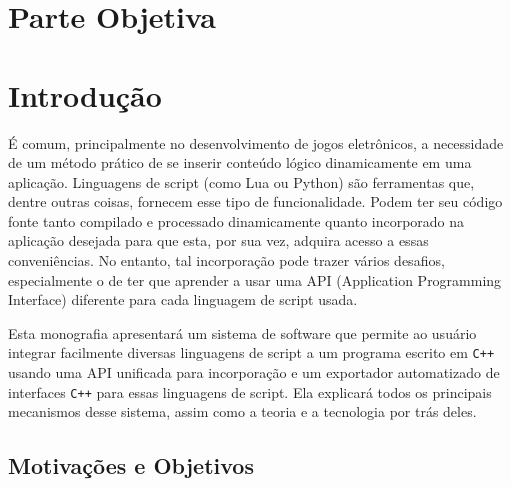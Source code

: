 \chapter*{Parte Objetiva}
\label{sec:parte_objetiva}
\chapter{Introdução}
\label{sec:intr}

É comum, principalmente no desenvolvimento de jogos eletrônicos, a necessidade
de um método prático de se inserir conteúdo lógico dinamicamente em uma
aplicação. Linguagens de script (como Lua ou Python) são ferramentas que, dentre
outras coisas, fornecem esse tipo de funcionalidade. Podem ter seu código fonte
tanto compilado e processado dinamicamente quanto incorporado na aplicação
desejada para que esta, por sua vez, adquira acesso a essas conveniências. No
entanto, tal incorporação pode trazer vários desafios, especialmente o de ter
que aprender a usar uma API (Application Programming Interface) diferente para
cada linguagem de script usada.

Esta monografia apresentará um sistema de software que permite ao usuário
integrar facilmente diversas linguagens de script a um programa escrito em
\verb$C++$ usando uma API unificada para incorporação e um exportador
automatizado de interfaces \verb$C++$ para essas linguagens de script. Ela
explicará todos os principais mecanismos desse sistema, assim como a teoria e a
tecnologia por trás deles.

\section{Motivações e Objetivos}
\label{sec:intr:motivacoes_objetivos}

